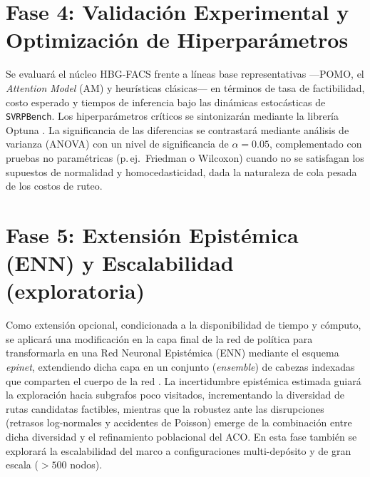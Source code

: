 \documentclass[12pt]{report}
\begin{document}
\section*{Fase 4: Validaci\'on Experimental y Optimizaci\'on de Hiperpar\'ametros}
Se evaluar\'a el n\'ucleo HBG-FACS frente a l\'ineas base representativas ---POMO, el \textit{Attention Model} (AM) y heur\'isticas cl\'asicas--- en t\'erminos de tasa de factibilidad, costo esperado y tiempos de inferencia bajo las din\'amicas estoc\'asticas de \texttt{SVRPBench}. Los hiperpar\'ametros cr\'iticos se sintonizar\'an mediante la librer\'ia Optuna \cite{Akiba2019Optuna}. La significancia de las diferencias se contrastar\'a mediante an\'alisis de varianza (ANOVA) con un nivel de significancia de $\alpha = 0.05$, complementado con pruebas no param\'etricas (p.\,ej.\ Friedman o Wilcoxon) cuando no se satisfagan los supuestos de normalidad y homocedasticidad, dada la naturaleza de cola pesada de los costos de ruteo.

\section*{Fase 5: Extensi\'on Epist\'emica (ENN) y Escalabilidad (exploratoria)}
Como extensi\'on opcional, condicionada a la disponibilidad de tiempo y c\'omputo, se aplicar\'a una modificaci\'on en la capa final de la red de pol\'itica para transformarla en una Red Neuronal Epist\'emica (ENN) mediante el esquema \textit{epinet}, extendiendo dicha capa en un conjunto (\textit{ensemble}) de cabezas indexadas que comparten el cuerpo de la red \cite{ENN_GFN_2025}. La incertidumbre epist\'emica estimada guiar\'a la exploraci\'on hacia subgrafos poco visitados, incrementando la diversidad de rutas candidatas factibles, mientras que la robustez ante las disrupciones (retrasos log-normales y accidentes de Poisson) emerge de la combinaci\'on entre dicha diversidad y el refinamiento poblacional del ACO. En esta fase tambi\'en se explorar\'a la escalabilidad del marco a configuraciones multi-dep\'osito y de gran escala ($>500$ nodos).
\end{document}

